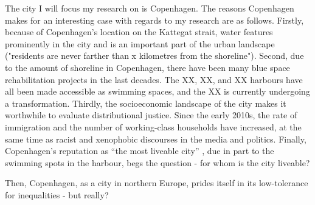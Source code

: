 \documentclass{article}
\begin{document}
The city I will focus my research on is Copenhagen.
The reasons Copenhagen makes for an interesting case with regards to my research are as follows. 
Firstly, because of Copenhagen's location on the Kattegat strait, water features prominently in the city and is an important part of the urban landscape ("residents are never farther than x kilometres from the shoreline"). 
Second, due to the amount of shoreline in Copenhagen, there have been many blue space rehabilitation projects in the last decades. The XX, XX, and XX harbours have all been made accessible as swimming spaces, and the XX is currently undergoing a transformation.
Thirdly, the socioeconomic landscape of the city makes it worthwhile to evaluate distributional justice. Since the early 2010s, the rate of immigration and the number of working-class households have increased, at the same time as racist and xenophobic discourses in the media and politics. 
Finally, Copenhagen's reputation as ``the most liveable city'' \parencite{visitdenmark_2021}, due in part to the swimming spots in the harbour, begs the question - for whom is the city liveable?

Then, Copenhagen, as a city in northern Europe, prides itself in its low-tolerance for inequalities - but really?


\printbibliography
\end{document}
